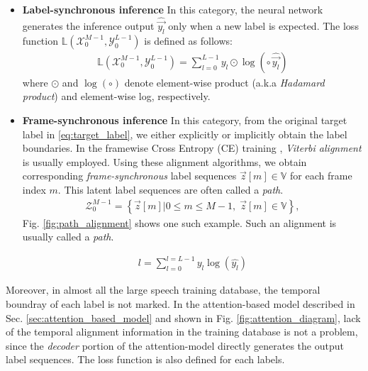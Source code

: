 \documentclass{article}
\begin{document}
\begin{itemize}
  \item {\bf Label-synchronous inference} In this category, the 
neural network generates the inference output $\widehat{\vec{y_l}}$ 
only when a new label is expected. The loss function 
$\mathbb{L}\left(\mathcal{X}_{0}^{M-1}, \mathcal{Y}_{0}^{L-1}\right)$ is 
defined as follows:
   \begin{align}
     \mathbb{L}\left(\mathcal{X}_{0}^{M-1}, \mathcal{Y}_{0}^{L-1}\right) 
        = \sum_{l=0}^{L-1}  y_l \odot \log\left( \circ \, \widehat{\vec{y_l}} \right)  
          \label{eq:label_synchronous_ce_loss} 
   \end{align}
where $\odot$ and $\log \left(\circ \right)$ denote element-wise product 
(a.k.a {\it Hadamard product}) and element-wise log, respectively. 


  \item {\bf Frame-synchronous inference} In this category, from the original 
target label in \eqref{eq:target_label}, we either explicitly or 
implicitly obtain the label boundaries.
In the framewise Cross Entropy (CE) training 
\cite{g_hinton_ieee_signal_processing_mag_2012_00, 
C_Kim_INTERSPEECH_2017_1, 
B_Li_INTERSPEECH_2017_1}, {\it Viterbi alignment}  
\cite{
x_huang_prentice_hall_2001_00,
l_r_rabiner_proceedings_of_ieee_1989_00} is usually employed. 
Using these alignment algorithms, 
we obtain corresponding {\it frame-synchronous }label sequences 
$\vec{z}[m] \in \mathbb{V}$ for each frame index $m$. This
latent label sequences are often called a {\it path}.
  \begin{align}
    \mathcal{Z}_{0}^{M-1}  =  
      \left\{\vec{z}[m]  \Big| 0 \le m \le M-1, \; \vec{z}[m] \in \mathbb{V} \right\}, 
    \label{eq:frame_target_label}
  \end{align}
Fig. \ref{fig:path_alignment} shows one such example. 
Such an alignment is usually called a {\it path}.

  \begin{align}
     l = \sum_{l=0}^{l=L-1}  y_l \log \left( \hat{y_l} \right)  
          \label{eq:label_synchronous_ce_loss} 
  \end{align}
\end{itemize}

Moreover, in almost all the large speech training database, the temporal boundray
of each label is not marked. In the attention-based model described in 
Sec. \ref{sec:attention_based_model} and shown in Fig. 
\ref{fig:attention_diagram}, lack of the temporal alignment information
in the training database is not a problem, since the {\it decoder} portion 
of the attention-model directly generates the output label sequences.
The loss function is also defined for each labels. 
\end{document}
